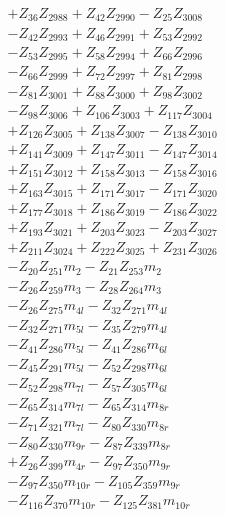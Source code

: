 \begin{multicols}{2}
\begin{align}
&+ Z_{36}Z_{2988} + Z_{42}Z_{2990} - Z_{25}Z_{3008}  \nonumber \\
&- Z_{42}Z_{2993} + Z_{46}Z_{2991} + Z_{53}Z_{2992}  \nonumber \\
&- Z_{53}Z_{2995} + Z_{58}Z_{2994} + Z_{66}Z_{2996}  \nonumber \\
&- Z_{66}Z_{2999} + Z_{72}Z_{2997} + Z_{81}Z_{2998}  \nonumber \\
&- Z_{81}Z_{3001} + Z_{88}Z_{3000} + Z_{98}Z_{3002}  \nonumber \\
&- Z_{98}Z_{3006} + Z_{106}Z_{3003} + Z_{117}Z_{3004}  \nonumber \\
&+ Z_{126}Z_{3005} + Z_{138}Z_{3007} - Z_{138}Z_{3010}  \nonumber \\
&+ Z_{141}Z_{3009} + Z_{147}Z_{3011} - Z_{147}Z_{3014}  \nonumber \\
&+ Z_{151}Z_{3012} + Z_{158}Z_{3013} - Z_{158}Z_{3016}  \nonumber \\
&+ Z_{163}Z_{3015} + Z_{171}Z_{3017} - Z_{171}Z_{3020}  \nonumber \\
&+ Z_{177}Z_{3018} + Z_{186}Z_{3019} - Z_{186}Z_{3022}  \nonumber \\
&+ Z_{193}Z_{3021} + Z_{203}Z_{3023} - Z_{203}Z_{3027}  \nonumber \\
&+ Z_{211}Z_{3024} + Z_{222}Z_{3025} + Z_{231}Z_{3026}  \nonumber \\
&- Z_{20}Z_{251}m_2 - Z_{21}Z_{253}m_2  \nonumber \\
&- Z_{26}Z_{259}m_3 - Z_{28}Z_{264}m_3  \nonumber \\
&- Z_{26}Z_{275}m_{4l} - Z_{32}Z_{271}m_{4l}  \nonumber \\
&- Z_{32}Z_{271}m_{5l} - Z_{35}Z_{279}m_{4l}  \nonumber \\
&- Z_{41}Z_{286}m_{5l} - Z_{41}Z_{286}m_{6l}  \nonumber \\
&- Z_{45}Z_{291}m_{5l} - Z_{52}Z_{298}m_{6l}  \nonumber \\
&- Z_{52}Z_{298}m_{7l} - Z_{57}Z_{305}m_{6l}  \nonumber \\
&- Z_{65}Z_{314}m_{7l} - Z_{65}Z_{314}m_{8r}  \nonumber \\
&- Z_{71}Z_{321}m_{7l} - Z_{80}Z_{330}m_{8r}  \nonumber \\
&- Z_{80}Z_{330}m_{9r} - Z_{87}Z_{339}m_{8r}  \nonumber \\
&+ Z_{26}Z_{399}m_{4r} - Z_{97}Z_{350}m_{9r}  \nonumber \\
&- Z_{97}Z_{350}m_{10r} - Z_{105}Z_{359}m_{9r}  \nonumber \\
&- Z_{116}Z_{370}m_{10r} - Z_{125}Z_{381}m_{10r}  \nonumber \\

\end{align}
\end{multicols}
